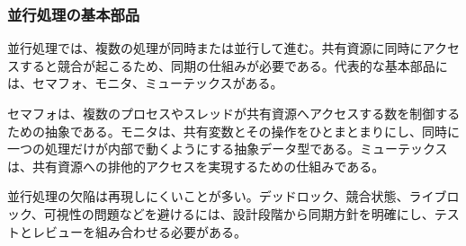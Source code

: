 \subsubsection{並行処理の基本部品}

並行処理では、複数の処理が同時または並行して進む。共有資源に同時にアクセスすると競合が起こるため、同期の仕組みが必要である。代表的な基本部品には、セマフォ、モニタ、ミューテックスがある。

セマフォは、複数のプロセスやスレッドが共有資源へアクセスする数を制御するための抽象である。モニタは、共有変数とその操作をひとまとまりにし、同時に一つの処理だけが内部で動くようにする抽象データ型である。ミューテックスは、共有資源への排他的アクセスを実現するための仕組みである。

並行処理の欠陥は再現しにくいことが多い。デッドロック、競合状態、ライブロック、可視性の問題などを避けるには、設計段階から同期方針を明確にし、テストとレビューを組み合わせる必要がある。
